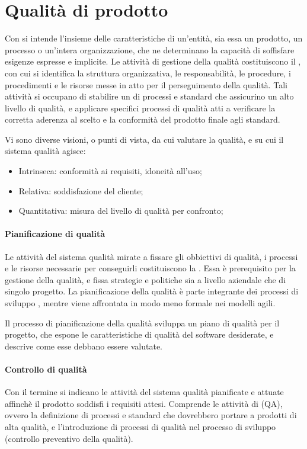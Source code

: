 \section{Qualità di prodotto}
Con  si intende l'insieme delle caratteristiche di un'entità, sia essa un prodotto, un processo o un'intera organizzazione, che ne determinano la capacità di soffisfare esigenze espresse e implicite. Le attività di gestione della qualità costituiscono il , con cui si identifica la struttura organizzativa, le responsabilità, le procedure, i procedimenti e le risorse messe in atto per il perseguimento della qualità. Tali attività  si occupano di stabilire un  di processi e standard che assicurino un alto livello di qualità, e applicare specifici processi di qualità atti a verificare la corretta aderenza al  scelto e la conformità del prodotto finale agli standard.

Vi sono diverse visioni, o punti di vista, da cui valutare la qualità, e su cui il sistema qualità agisce:
\begin{itemize}
	\item Intrinseca: conformità ai requisiti, idoneità all'uso;
	\item Relativa: soddisfazione del cliente;
	\item Quantitativa: misura del livello di qualità per confronto;
\end{itemize}

\paragraph{Pianificazione di qualità}
Le attività del sistema qualità mirate a fissare gli obbiettivi di qualità, i processi e le risorse necessarie per conseguirli costituiscono la . Essa è prerequisito per la gestione della qualità, e fissa strategie e politiche sia a livello aziendale che di singolo progetto. La pianificazione della qualità è parte integrante dei processi di sviluppo , mentre viene affrontata in modo meno formale nei modelli agili.

Il processo di pianificazione della qualità sviluppa un piano di qualità per il progetto, che espone le caratteristiche di qualità del software desiderate, e descrive come esse debbano essere valutate. 

\paragraph{Controllo di qualità}
Con il termine  si indicano le attività del sistema qualità pianificate e attuate affinchè il prodotto soddisfi i requisiti attesi. Comprende le attività di  (QA), ovvero la definizione di processi e standard che dovrebbero portare a prodotti di alta qualità, e l'introduzione di processi di qualità nel processo di sviluppo (controllo preventivo della qualità).

